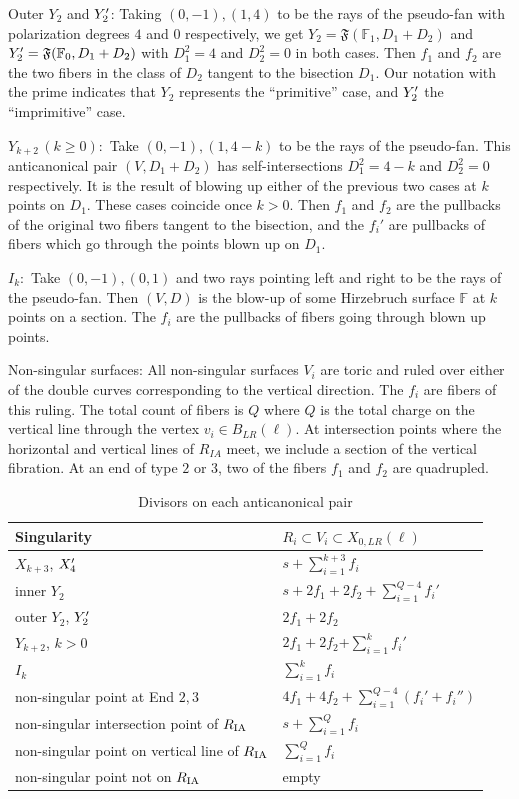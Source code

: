 \documentclass[table,x11names]{amsart}
\begin{document}
\smallskip
{Outer ${Y_2}$ and ${Y'_2}$:} Taking $(0,-1),(1,4)$ to be the rays of the pseudo-fan
with polarization degrees $4$ and $0$ respectively,
we get $Y_2 = \mathfrak{F}(\mathbb{F}_1 , D_1+D_2)$ and
$Y'_2 = \mathfrak{F}(\mathbb{F}_0 , D_1+D_2)$
with $D_1^2=4$ and 
$D_2^2=0$ in both cases. Then $f_1$ and $f_2$
are the two fibers in the class of $D_2$ tangent to the bisection $D_1$.
Our notation with the prime indicates that $Y_2$ represents the
``primitive'' case, and $Y'_2$ the ``imprimitive'' case. 

\smallskip
${Y_{k+2}\,(k\geq 0):}$ Take $(0,-1),(1,4-k)$ to be the rays of the pseudo-fan.
This anticanonical pair $(V,D_1+D_2)$ has self-intersections $D_1^2=4-k$ and
$D_2^2=0$ respectively. It is the result of blowing up either of the previous
two cases at $k$ points on $D_1$. These cases coincide once $k>0$. Then $f_1$ and
$f_2$ are the pullbacks of the original two fibers tangent to the bisection, and the $f_i'$
are pullbacks of fibers which go through the
points blown up on $D_1$.

\smallskip
${I_k:}$ Take $(0,-1),(0,1)$ and two rays pointing left and right to be the 
rays of the pseudo-fan. Then $(V,D)$ is the blow-up of some
Hirzebruch surface $\mathbb{F}$ at $k$ points on a section. The $f_i$
are the pullbacks of fibers going through blown up points.

\smallskip
{Non-singular surfaces:} All non-singular surfaces $V_i$ are toric and ruled
over either of the double curves corresponding to the
vertical direction. The $f_i$ are fibers of this ruling. The total count of
fibers is $Q$ where $Q$ is the total charge on the vertical
line through the vertex $v_i\in B_{LR}(\ell)$.
At intersection points where the horizontal and
vertical lines of $R_{IA}$ meet, we include a section of the
vertical fibration. At an end of type $2$ or $3$, two of the fibers 
$f_1$ and $f_2$ are quadrupled.


\begin{table}
\caption{Divisors on each anticanonical pair}
\label{tab:divs-on-ias}
 \begin{tabular}{ l l }
Singularity & $R_i\subset V_i\subset X_{0,LR}(\ell)$ \\ 
\hline
$X_{k+3}$, $X'_4$ & $s+\sum_{i=1}^{k+3} f_i$ \\
inner $Y_2$ & $s+2f_1+2f_2+\sum_{i=1}^{Q-4} f_i'$  \\
outer $Y_2$, $Y'_2$ & $2f_1+2f_2$  \\
 $Y_{k+2}$, $k>0$  & $2f_1+2f_2$+$\sum_{i=1}^k f_i'$   \\
$I_k$ & $\sum_{i=1}^k f_i$  \\
non-singular point at End $2,3$ & $4f_1+4f_2+\sum_{i=1}^{Q-4} (f_i'+f_i'')$  \\
non-singular intersection point of $R_{{\rm IA}}$ & $s+ \sum_{i=1}^Q f_i$ \\
non-singular point on vertical line of $R_{{\rm IA}}$ & $\sum_{i=1}^Q f_i$  \\
non-singular point not on $R_{{\rm IA}}$ & empty  \\
\end{tabular}
\vspace{5pt}
\end{table} 
\end{document}
